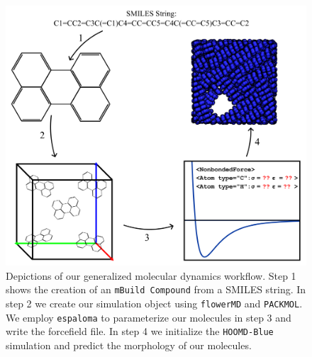 \begin{figure}
    \centering
    \includegraphics[width=.9\linewidth]{src/figures/FF_figs/MD_process.png}
    \caption{Depictions of our generalized molecular dynamics workflow. Step 1 shows the creation of an \texttt{mBuild Compound} from a SMILES string. In step 2 we create our simulation object using \texttt{flowerMD} and \texttt{PACKMOL}. We employ \texttt{espaloma} to parameterize our molecules in step 3 and write the forcefield file. In step 4 we initialize the \texttt{HOOMD-Blue} simulation and predict the morphology of our molecules.}
    \label{MD-Diagram}
\end{figure}
